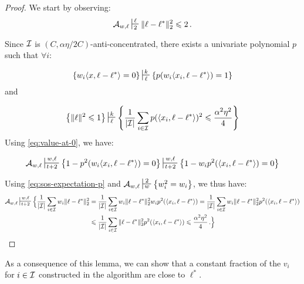 \begin{proof}
We start by observing:
\[
\cA_{w,\ell} \sststile{2}{\ell} \|\ell - \ell^*\|_2^2 \leq 2 \mper
\]

Since $\mathcal I$ is $(C,\alpha \eta/2C)$-anti-concentrated, there exists a univariate polynomial $p$ such that $\forall i$:

\begin{equation}
\Set{w_i\iprod{x,\ell-\ell^*} = 0} \sststile{\ell}{k} \Set{p(w_i\iprod{x_i,\ell-\ell^*}) = 1} \label{eq:value-at-0}
\end{equation}
and 

\begin{equation} \label{eq:sos-expectation-p}
\Set{\|\ell\|^2 \leq 1} \sststile{\ell}{k} \Set{\frac{1}{|\cI|} \sum_{i \in \cI} p( \iprod{x_i,\ell-\ell^*})^2 \leq \frac{\alpha^2  \eta^2}{4}}
\end{equation}
Using \eqref{eq:value-at-0}, we have:

\begin{align*}
\cA_{w,\ell} \sststile{t+2}{w,\ell} \Set{ 1-p^2 (w_i \langle x_i, \ell - \ell^* \rangle) = 0} \sststile{t+2}{w,\ell} \Set{1- w_i p^2 (\langle x_i, \ell - \ell^* \rangle) = 0}\\
\end{align*}

Using \eqref{eq:sos-expectation-p} and $\cA_{w,\ell} \sststile{w}{2} \Set{w_i^2 = w_i}$, we thus have:
\begin{align*}
\cA_{w,\ell}  \sststile{t+2}{w,\ell} \Bigl\{ \frac{1}{|\cI|} \sum_{i \in \cI} w_i \|\ell-\ell^*\|_2^2 &= \frac{1}{|\cI|} \sum_{i \in \cI} w_i \|\ell-\ell^*\|_2^2 w_i p^2 (\langle x_i, \ell-\ell^* \rangle) 
= \frac{1}{|\cI|} \sum_{i \in \cI} w_i \|\ell-\ell^*\|_2^2 p^2 (\langle x_i, \ell-\ell^*\rangle) \\
&\leq \frac{1}{|\cI|} \sum_{i \in \cI} \|\ell-\ell^*\|_2^2 p^2 (\langle x_i, \ell-\ell^* \rangle)  \leq \frac{\alpha^2 \eta^2}{4} \mper
\Bigr\}
\end{align*}

\end{proof}



As a consequence of this lemma, we can show that a constant fraction of the $v_i$ for $i \in \mathcal I$ constructed in the algorithm are close to $\ell^*$. 

